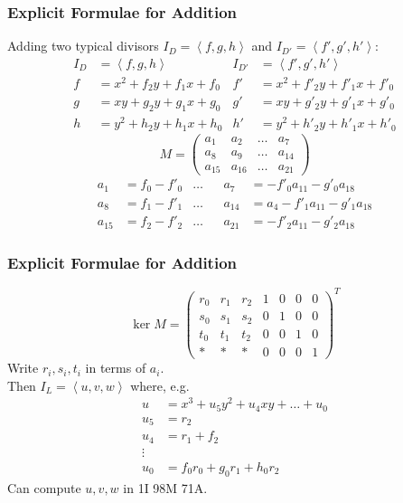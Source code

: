 \documentclass{beamer}
\newcommand{\pid}[1]{\left\langle #1 \right\rangle}
\begin{document}

\begin{frame}
\frametitle{Explicit Formulae for Addition}
  Adding two typical divisors $I_D = \pid{f,g,h}$ and $I_{D'} = \pid{f',g',h'}$:
  \begin{align*}
    I_D &= \pid{f, g, h}           & I_{D'} &= \pid{f', g', h'} \\
    f   &= x^2 + f_2y + f_1x + f_0 & f'     &= x^2 + f'_2y + f'_1x + f'_0 \\
    g   &=  xy + g_2y + g_1x + g_0 & g'     &=  xy + g'_2y + g'_1x + g'_0 \\
    h   &= y^2 + h_2y + h_1x + h_0 & h'     &= y^2 + h'_2y + h'_1x + h'_0
  \end{align*}
  \[ M = \begin{pmatrix}
    a_1 & a_2 & \dots & a_7 \\
    a_8 & a_9 & \dots & a_{14} \\
    a_{15} & a_{16} & \dots & a_{21}
  \end{pmatrix} \]
  \begin{align*}
    a_1    &= f_0 - f'_0 & \dots && a_7    &=     - f'_0a_{11} - g'_0a_{18} \\
    a_8    &= f_1 - f'_1 & \dots && a_{14} &= a_4 - f'_1a_{11} - g'_1a_{18} \\
    a_{15} &= f_2 - f'_2 & \dots && a_{21} &=     - f'_2a_{11} - g'_2a_{18}
  \end{align*}
\end{frame}


\begin{frame}
\frametitle{Explicit Formulae for Addition}
  \[ \ker M = \begin{pmatrix}
    r_0 & r_1 & r_2 & 1 & 0 & 0 & 0 \\
    s_0 & s_1 & s_2 & 0 & 1 & 0 & 0 \\
    t_0 & t_1 & t_2 & 0 & 0 & 1 & 0 \\
      * &   * &   * & 0 & 0 & 0 & 1
  \end{pmatrix}^T \]
  Write $r_i, s_i, t_i$ in terms of $a_i$. \\
  Then $I_L = \pid{u, v, w}$ where, e.g.
  \begin{align*}
    u &= x^3 + u_5y^2 + u_4xy + \dots + u_0 \\
    u_5 &= r_2 \\
    u_4 &= r_1 + f_2 \\
    \vdots \\
    u_0 &= f_0r_0 + g_0r_1 + h_0r_2
  \end{align*}
  Can compute $u, v, w$ in 1I 98M 71A.
\end{frame}
\end{document}
